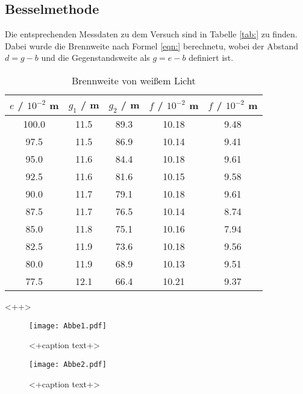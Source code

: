 \subsection{Besselmethode}
Die entsprechenden Messdaten zu dem Versuch sind in Tabelle \ref{tab:} zu finden.  Dabei wurde die Brennweite nach Formel \ref{eqn:} berechnetu, wobei der Abstand $d = g - b$ und die Gegenstandsweite als $g = e - b$ definiert ist.
\begin{table}
  \centering
  \begin{tabular}{c c c | c c}
    \toprule
    $e$ / $10^{-2}$ m & $g_1$ / m & $g_2$ / m & $f$ / $10^{-2}$ m & $f$ / $10^{-2}$ m\\
    \midrule
	100.0	& 11.5	& 89.3	& 10.18	& 9.48	\\
	97.5	& 11.5	& 86.9	& 10.14	& 9.41	\\
	95.0	& 11.6	& 84.4	& 10.18	& 9.61	\\
	92.5	& 11.6	& 81.6	& 10.15	& 9.58	\\
	90.0	& 11.7	& 79.1	& 10.18	& 9.61	\\
	87.5	& 11.7	& 76.5	& 10.14	& 8.74	\\	
	85.0	& 11.8	& 75.1	& 10.16	& 7.94	\\	
	82.5	& 11.9	& 73.6	& 10.18	& 9.56	\\
	80.0	& 11.9	& 68.9	& 10.13	& 9.51	\\
	77.5	& 12.1	& 66.4	& 10.21	& 9.37	\\
    \bottomrule
  \end{tabular}
  	\caption{Brennweite von weißem Licht}
  \label{tab:ffw}
\end{table}<++>


\begin{figure}
  \centering
    \texttt{[image: Abbe1.pdf]}
  \caption{<+caption text+>}
  \label{fig:<+label+>}
\end{figure}

\begin{figure}
  \centering
  \texttt{[image: Abbe2.pdf]}
  \caption{<+caption text+>}
  \label{fig:<+label+>}
\end{figure}
